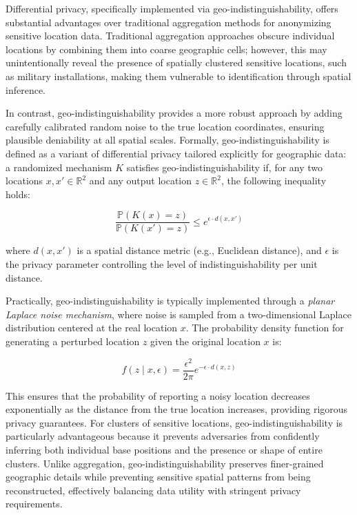 \documentclass[twocolumn]{article}
\begin{document}
Differential privacy, specifically implemented via geo-indistinguishability, offers substantial advantages over traditional aggregation methods for anonymizing sensitive location data. Traditional aggregation approaches obscure individual locations by combining them into coarse geographic cells; however, this may unintentionally reveal the presence of spatially clustered sensitive locations, such as military installations, making them vulnerable to identification through spatial inference.

In contrast, geo-indistinguishability provides a more robust approach by adding carefully calibrated random noise to the true location coordinates, ensuring plausible deniability at all spatial scales. Formally, geo-indistinguishability is defined as a variant of differential privacy tailored explicitly for geographic data: a randomized mechanism $K$ satisfies geo-indistinguishability if, for any two locations $x, x' \in \mathbb{R}^2$ and any output location $z \in \mathbb{R}^2$, the following inequality holds:

\begin{equation}
\frac{\mathbb{P}(K(x) = z)}{\mathbb{P}(K(x') = z)} \leq e^{\epsilon \cdot d(x,x')}
\end{equation}

where $d(x,x')$ is a spatial distance metric (e.g., Euclidean distance), and $\epsilon$ is the privacy parameter controlling the level of indistinguishability per unit distance.

Practically, geo-indistinguishability is typically implemented through a \textit{planar Laplace noise mechanism}, where noise is sampled from a two-dimensional Laplace distribution centered at the real location $x$. The probability density function for generating a perturbed location $z$ given the original location $x$ is:

\begin{equation}
f(z \mid x, \epsilon) = \frac{\epsilon^2}{2\pi} e^{-\epsilon \cdot d(x,z)}
\end{equation}

This ensures that the probability of reporting a noisy location decreases exponentially as the distance from the true location increases, providing rigorous privacy guarantees. For clusters of sensitive locations, geo-indistinguishability is particularly advantageous because it prevents adversaries from confidently inferring both individual base positions and the presence or shape of entire clusters. Unlike aggregation, geo-indistinguishability preserves finer-grained geographic details while preventing sensitive spatial patterns from being reconstructed, effectively balancing data utility with stringent privacy requirements.
\end{document}
